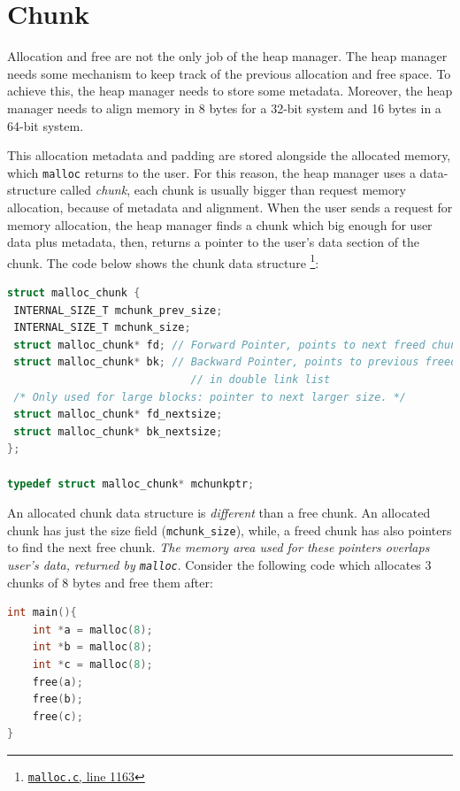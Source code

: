 \documentclass{masterthesis}
\newcommand*\mallocc{\lstinline{malloc}}
\begin{document}
\section{Chunk}

Allocation and free are not the only job of the heap manager. The heap manager needs some mechanism to keep track of the previous allocation and free space.  To achieve this, the heap manager needs to store some metadata.  Moreover, the heap manager needs to align memory in 8 bytes for a 32-bit system and 16 bytes in a 64-bit system.

This allocation metadata and padding are stored alongside the allocated memory, which \mallocc{} returns to the user. For this reason, the heap manager uses a data-structure called \emph{chunk}, each chunk is usually bigger than request memory allocation, because of metadata and alignment. When the user sends a request for memory allocation, the heap manager finds a chunk which big enough for user data plus metadata, then, returns a pointer to the user's data section of the chunk. The code below shows the chunk data structure \footnote{\href{https://sourceware.org/git/?p=glibc.git;a=blob;f=malloc/malloc.c;\#l1163}{\texttt{malloc.c}, line 1163}}:

\begin{lstlisting}[language=c,frame=single]
struct malloc_chunk {
 INTERNAL_SIZE_T mchunk_prev_size;
 INTERNAL_SIZE_T mchunk_size;
 struct malloc_chunk* fd; // Forward Pointer, points to next freed chunk
 struct malloc_chunk* bk; // Backward Pointer, points to previous freed chunk
                             // in double link list
 /* Only used for large blocks: pointer to next larger size. */
 struct malloc_chunk* fd_nextsize;
 struct malloc_chunk* bk_nextsize;
};

typedef struct malloc_chunk* mchunkptr;
\end{lstlisting}

An allocated chunk data structure is \emph{different} than a free chunk. An allocated chunk has just the size field (\lstinline{mchunk_size}), while, a freed chunk has also pointers to find the next free chunk.
\emph{The memory area used for these pointers overlaps user's data, returned by \mallocc{}}.
Consider the following code which allocates 3 chunks of 8 bytes and free them after:

\begin{lstlisting}[language=c,frame=tlrb]
int main(){
	int *a = malloc(8);
	int *b = malloc(8);
	int *c = malloc(8);
	free(a);
	free(b);
	free(c);
}
\end{lstlisting}
\end{document}
